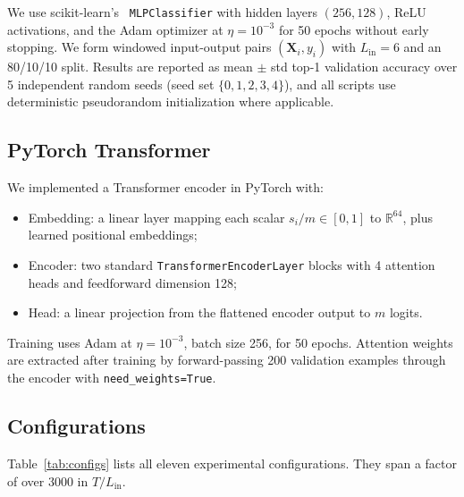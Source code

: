 \documentclass[11pt]{article}
\theoremstyle{plain}
\theoremstyle{definition}
\newcommand{\R}{\mathbb{R}}
\begin{document}
We use scikit-learn's~\citet{sklearn} \texttt{MLPClassifier} with hidden layers $(256, 128)$, ReLU activations, and the Adam optimizer at $\eta = 10^{-3}$ for 50 epochs without early stopping. We form windowed input-output pairs $(\mathbf{X}_i, y_i)$ with $L_{\mathrm{in}} = 6$ and an 80/10/10 split. Results are reported as mean $\pm$ std top-1 validation accuracy over 5 independent random seeds (seed set $\{0,1,2,3,4\}$), and all scripts use deterministic pseudorandom initialization where applicable.

\subsection{PyTorch Transformer}

We implemented a Transformer encoder in PyTorch with:
\begin{itemize}[leftmargin=2em,itemsep=2pt]
  \item Embedding: a linear layer mapping each scalar $s_i/m \in [0,1]$ to $\R^{64}$, plus learned positional embeddings;
  \item Encoder: two standard \texttt{TransformerEncoderLayer} blocks with 4 attention heads and feedforward dimension 128;
  \item Head: a linear projection from the flattened encoder output to $m$ logits.
\end{itemize}
Training uses Adam at $\eta = 10^{-3}$, batch size 256, for 50 epochs. Attention weights are extracted after training by forward-passing 200 validation examples through the encoder with \texttt{need\_weights=True}.

\subsection{Configurations}

Table~\ref{tab:configs} lists all eleven experimental configurations. They span a factor of over 3000 in $T/L_{\mathrm{in}}$.
\end{document}
